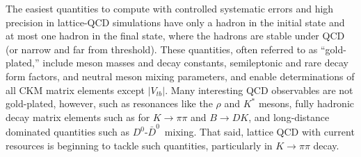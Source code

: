 The easiest quantities to compute with controlled systematic errors and high
precision in lattice-QCD simulations have only a hadron in the initial state
and at most one hadron in the final state, where the hadrons are stable under
QCD (or narrow and far from threshold).  These quantities, often referred to
as ``gold-plated,'' include meson masses and decay constants, semileptonic and
rare decay form factors, and neutral meson mixing parameters, and enable
determinations of all CKM matrix elements except $|V_{tb}|$.  Many interesting
QCD observables are not gold-plated, however, such as resonances like the
$\rho$ and $K^*$ mesons, fully hadronic decay matrix elements such as for $K
\to \pi\pi$ and $B\to DK$, and long-distance dominated quantities such as
$D^0$-$\bar{D}^0$~mixing.  That said, lattice QCD with current resources is
beginning to tackle such quantities, particularly in $K\to\pi\pi$ decay.

